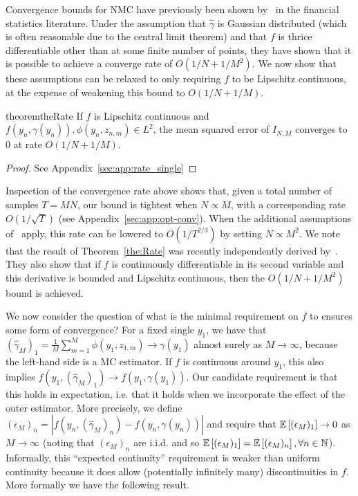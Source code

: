 Convergence bounds for NMC have previously been shown by~\citet{hong2009estimating} in the 
financial statistics literature.  Under the assumption that $\hat{\gamma}$ is Gaussian distributed
(which is often reasonable due to the central limit theorem) and that $f$ is thrice differentiable
other than at some finite number of points, they have shown that it is possible to achieve a
converge rate of $O(1/N+1/M^2)$.  We now show that these assumptions can be relaxed to only requiring
$f$ to be Lipschitz continuous, at the expense of weakening this bound to $O(1/N+1/M)$.
\begin{restatable}{theorem}{theRate} \label{the:Rate}
	If $f$ is Lipschitz continuous and $f(y_n, \gamma(y_n)), \phi(y_n, z_{n,m}) \in
	L^2$, the mean squared error of $I_{N,M}$ converges to $0$ at rate $O\left(1/N +
	1/M\right)$.
\end{restatable}
\begin{proof}
See Appendix~\ref{sec:app:rate_single}
\end{proof}
Inspection of the convergence rate above shows that, given a total number of samples
$T=MN$, our bound is tightest when $N\propto M$, with a
corresponding rate $O(1/\sqrt{T})$ (see Appendix~\ref{sec:app:opt-conv}). 
When the additional assumptions of~\citet{hong2009estimating}
apply, this rate can be lowered to $O(1/T^{2/3})$ by setting $N \propto M^2$.  We note that
the result of Theorem~\ref{the:Rate} was recently independently derived by~\citet{fort2016mcmc}.
They also show that if $f$ is continuously differentiable in its second variable and this
derivative is bounded and Lipschitz continuous, then the $O(1/N+1/M^2)$ bound is achieved.

We now consider the question of what is the minimal requirement on $f$ to ensures some form of
convergence? For a fixed single $y_1$, we
have that $(\hat{\gamma}_M)_1=\frac{1}{M}\sum_{m=1}^{M} \phi(y_1,z_{1,m})\rightarrow\gamma(y_1)$ 
almost surely as $M \rightarrow \infty$, because the left-hand side is a MC estimator. If $f$ is continuous
around $y_1$, this also implies $f(y_1,(\hat{\gamma}_M)_1) \rightarrow
f(y_1,\gamma(y_1))$.  Our candidate requirement is that this holds in
expectation, i.e. that it holds when we incorporate the effect of the outer estimator.
More precisely, we define $(\epsilon_M)_n = \left|f(y_n, (\hat{\gamma}_M)_n) -
f(y_n,\gamma(y_n))\right|$ and require that $\mathbb{E}\left[(\epsilon_M)_1\right] \to 0$ as $M
\to \infty$ (noting that $(\epsilon_M)_n$ are i.i.d. and so
$\mathbb{E}\left[(\epsilon_M)_1\right] = \mathbb{E}\left[(\epsilon_M)_n\right], \forall n\in\mathbb{N}$). Informally, this ``expected continuity''
requirement is weaker than uniform continuity because it does allow (potentially infinitely
many) discontinuities in $f$.  More formally we have the following result.

